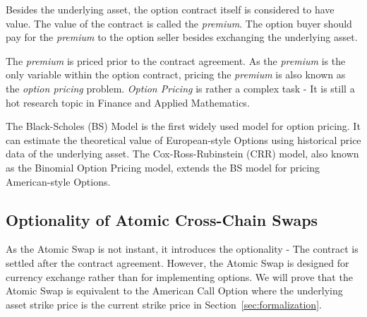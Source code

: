 Besides the underlying asset, the option contract itself is considered to have value.
The value of the contract is called the \textit{premium}.
The option buyer should pay for the \textit{premium} to the option seller besides exchanging the underlying asset.

The \textit{premium} is priced prior to the contract agreement.
As the \textit{premium} is the only variable within the option contract,
pricing the \textit{premium} is also known as the \textit{option pricing} problem.
\textit{Option Pricing} is rather a complex task - It is still a hot research topic in Finance and Applied Mathematics.

The Black-Scholes (BS) Model is the first widely used model for option pricing.
It can estimate the theoretical value of European-style Options using historical price data of the underlying asset.
The Cox-Ross-Rubinstein (CRR) model, also known as the Binomial Option Pricing model, extends the BS model for pricing American-style Options.

\subsection{Optionality of Atomic Cross-Chain Swaps}

As the Atomic Swap is not instant, it introduces the optionality - The contract is settled after the contract agreement.
However, the Atomic Swap is designed for currency exchange rather than for implementing options.
We will prove that the Atomic Swap is equivalent to the American Call Option
where the underlying asset strike price is the current strike price in Section~\ref{sec:formalization}.